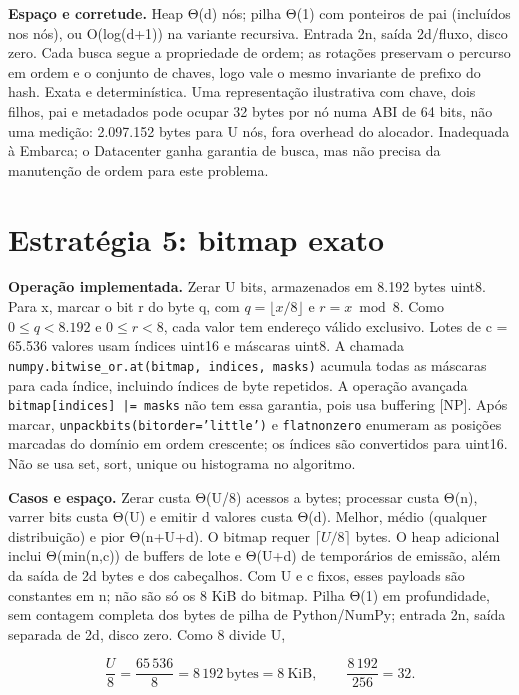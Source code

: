 \documentclass[
  brazilian,
  11pt,
  a4paper,
]{article}
\let\oldsection\section
\renewcommand{\section}{\Needspace{6\baselineskip}\oldsection}
\begin{document}
\textbf{Espaço e corretude.} Heap Θ(d) nós; pilha Θ(1) com ponteiros de
pai (incluídos nos nós), ou O(log(d+1)) na variante recursiva. Entrada
2n, saída 2d/fluxo, disco zero. Cada busca segue a propriedade de ordem;
as rotações preservam o percurso em ordem e o conjunto de chaves, logo
vale o mesmo invariante de prefixo do hash. Exata e determinística. Uma
representação ilustrativa com chave, dois filhos, pai e metadados pode
ocupar 32 bytes por nó numa ABI de 64 bits, não uma medição: 2.097.152
bytes para U nós, fora overhead do alocador. Inadequada à Embarca; o
Datacenter ganha garantia de busca, mas não precisa da manutenção de
ordem para este problema.

\section{Estratégia 5: bitmap exato}\label{estratuxe9gia-5-bitmap-exato}

\textbf{Operação implementada.} Zerar U bits, armazenados em 8.192 bytes
uint8. Para x, marcar o bit r do byte q, com \(q=\lfloor x/8\rfloor\) e
\(r=x\bmod8\). Como \(0\le q<8.192\) e \(0\le r<8\), cada valor tem
endereço válido exclusivo. Lotes de c = 65.536 valores usam índices
uint16 e máscaras uint8. A chamada
\texttt{numpy.\allowbreak{}bitwise\_\allowbreak{}or.\allowbreak{}at(bitmap, indices, masks)}
acumula todas as máscaras para cada índice, incluindo índices de byte
repetidos. A operação avançada \texttt{bitmap[indices] |= masks} não tem
essa garantia, pois usa buffering {[}NP{]}. Após marcar,
\texttt{unpackbits(bitorder='little')} e \texttt{flatnonzero} enumeram
as posições marcadas do domínio em ordem crescente; os índices são
convertidos para uint16. Não se usa set, sort, unique ou histograma no
algoritmo.

\textbf{Casos e espaço.} Zerar custa Θ(U/8) acessos a bytes; processar
custa Θ(n), varrer bits custa Θ(U) e emitir d valores custa Θ(d).
Melhor, médio (qualquer distribuição) e pior Θ(n+U+d). O bitmap requer
\(\lceil U/8\rceil\) bytes. O heap adicional inclui Θ(min(n,c)) de
buffers de lote e Θ(U+d) de temporários de emissão, além da saída de 2d
bytes e dos cabeçalhos. Com U e c fixos, esses payloads são constantes
em n; não são só os 8 KiB do bitmap. Pilha Θ(1) em profundidade, sem
contagem completa dos bytes de pilha de Python/NumPy; entrada 2n, saída
separada de 2d, disco zero. Como 8 divide U,

\[\frac U8=\frac{65\,536}8=8\,192\ \text{bytes}=8\ \text{KiB},\qquad
\frac{8\,192}{256}=32.\]
\end{document}

